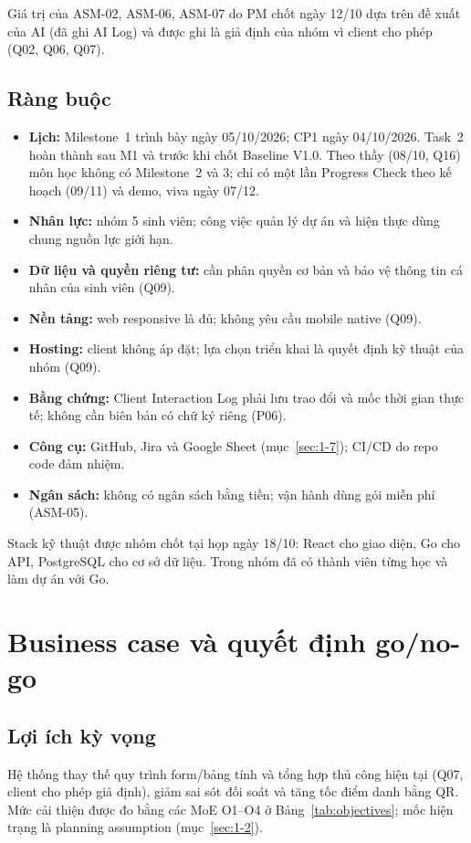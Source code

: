 Giá trị của ASM-02, ASM-06, ASM-07 do PM chốt ngày 12/10 dựa trên đề xuất của AI (đã ghi AI Log) và được ghi là giả định của nhóm vì client cho phép (Q02, Q06, Q07).

\subsection*{Ràng buộc}
\begin{itemize}
  \item \textbf{Lịch:} Milestone~1 trình bày ngày 05/10/2026; CP1 ngày 04/10/2026. Task~2 hoàn thành sau M1 và trước khi chốt Baseline V1.0. Theo thầy (08/10, Q16) môn học không có Milestone~2 và 3; chỉ có một lần Progress Check theo kế hoạch (09/11) và demo, viva ngày 07/12.
  \item \textbf{Nhân lực:} nhóm 5 sinh viên; công việc quản lý dự án và hiện thực dùng chung nguồn lực giới hạn.
  \item \textbf{Dữ liệu và quyền riêng tư:} cần phân quyền cơ bản và bảo vệ thông tin cá nhân của sinh viên (Q09).
  \item \textbf{Nền tảng:} web responsive là đủ; không yêu cầu mobile native (Q09).
  \item \textbf{Hosting:} client không áp đặt; lựa chọn triển khai là quyết định kỹ thuật của nhóm (Q09).
  \item \textbf{Bằng chứng:} Client Interaction Log phải lưu trao đổi và mốc thời gian thực tế; không cần biên bản có chữ ký riêng (P06).
\end{itemize}
\begin{itemize}
  \item \textbf{Công cụ:} GitHub, Jira và Google Sheet (mục~\ref{sec:1-7}); CI/CD do repo code đảm nhiệm.
  \item \textbf{Ngân sách:} không có ngân sách bằng tiền; vận hành dùng gói miễn phí (ASM-05).
\end{itemize}
Stack kỹ thuật được nhóm chốt tại họp ngày 18/10: React cho giao diện, Go cho API, PostgreSQL cho cơ sở dữ liệu. Trong nhóm đã có thành viên từng học và làm dự án với Go.

\section{Business case và quyết định go/no-go}
\label{sec:1-3}
\subsection*{Lợi ích kỳ vọng}
Hệ thống thay thế quy trình form/bảng tính và tổng hợp thủ công hiện tại (Q07, client cho phép giả định), giảm sai sót đối soát và tăng tốc điểm danh bằng QR. Mức cải thiện được đo bằng các MoE O1--O4 ở Bảng~\ref{tab:objectives}; mốc hiện trạng là planning assumption (mục~\ref{sec:1-2}).

